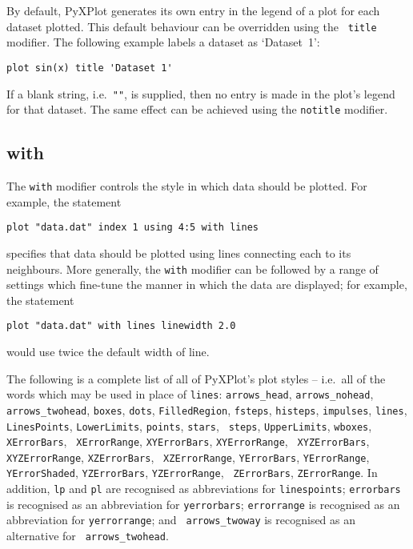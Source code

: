 By default, PyXPlot generates its own entry in the legend of a plot for each
dataset plotted.  This default behaviour can be overridden using the {\tt
title} modifier. The following example labels a dataset as `Dataset~1':

\begin{verbatim}
plot sin(x) title 'Dataset 1'
\end{verbatim}

\noindent If a blank string, i.e.\ {\tt ""}, is supplied, then no entry is made
in the plot's legend for that dataset. The same effect can be achieved using
the {\tt notitle} modifier.


\subsection{with}

The {\tt with} modifier controls the style in which data should be plotted. For
example, the statement
\begin{verbatim}
plot "data.dat" index 1 using 4:5 with lines
\end{verbatim}
specifies that data should be plotted using lines connecting each \datapoint to
its neighbours. More generally, the {\tt with} modifier can be followed by a
range of settings which fine-tune the manner in which the data are displayed;
for example, the statement
\begin{verbatim}
plot "data.dat" with lines linewidth 2.0
\end{verbatim}
would use twice the default width of line.

The following is a complete list of all of PyXPlot's plot styles -- i.e.\ all
of the words which may be used in place of {\tt lines}: {\tt arrows\_\-head},
{\tt arrows\_\-no\-head}, {\tt arrows\_\-two\-head}, {\tt boxes}, {\tt dots},
{\tt Filled\-Region}, {\tt fsteps}, {\tt histeps}, {\tt impulses}, {\tt lines},
{\tt Lines\-Points}, {\tt Lower\-Limits}, {\tt points}, {\tt stars}, {\tt
steps}, {\tt Upper\-Limits}, {\tt wbox\-es}, {\tt X\-Error\-Bars}, {\tt
X\-Error\-Range}, {\tt XY\-Error\-Bars}, {\tt XY\-Error\-Range}, {\tt
XYZ\-Error\-Bars}, {\tt XYZ\-Error\-Range}, {\tt XZ\-Error\-Bars}, {\tt
XZ\-Error\-Range}, {\tt Y\-Error\-Bars}, {\tt Y\-Error\-Range}, {\tt
Y\-Error\-Shaded}, {\tt YZ\-Error\-Bars}, {\tt YZ\-Error\-Range}, {\tt
Z\-Error\-Bars}, {\tt Z\-Error\-Range}. In addition, {\tt lp} and {\tt pl} are
recognised as abbreviations for {\tt lines\-points}; {\tt error\-bars} is
recognised as an abbreviation for {\tt y\-error\-bars}; {\tt error\-range} is
recognised as an abbreviation for {\tt y\-error\-range}; and {\tt
arrows\_\-two\-way} is recognised as an alternative for {\tt
arrows\_\-two\-head}.

